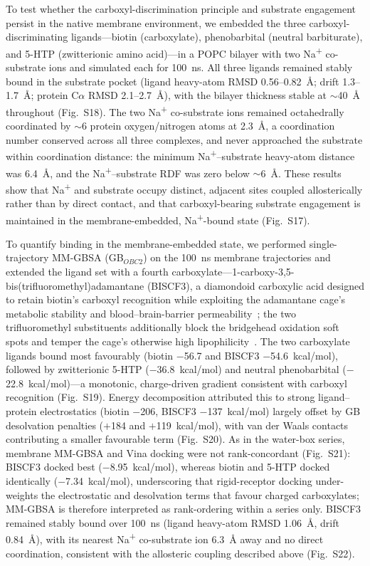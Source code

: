 \documentclass[pdflatex,sn-nature]{sn-jnl}
\begin{document}
To test whether the carboxyl-discrimination principle and substrate engagement persist in the native membrane environment, we embedded the three carboxyl-discriminating ligands---biotin (carboxylate), phenobarbital (neutral barbiturate), and 5-HTP (zwitterionic amino acid)---in a POPC bilayer with two Na\textsuperscript{+} co-substrate ions and simulated each for 100~ns. All three ligands remained stably bound in the substrate pocket (ligand heavy-atom RMSD 0.56--0.82~\AA{}; drift 1.3--1.7~\AA{}; protein C$\alpha$ RMSD 2.1--2.7~\AA{}), with the bilayer thickness stable at $\sim$40~\AA{} throughout (Fig.~S18). The two Na\textsuperscript{+} co-substrate ions remained octahedrally coordinated by $\sim$6 protein oxygen/nitrogen atoms at 2.3~\AA{}, a coordination number conserved across all three complexes, and never approached the substrate within coordination distance: the minimum Na\textsuperscript{+}--substrate heavy-atom distance was 6.4~\AA{}, and the Na\textsuperscript{+}--substrate RDF was zero below $\sim$6~\AA{}. These results show that Na\textsuperscript{+} and substrate occupy distinct, adjacent sites coupled allosterically rather than by direct contact, and that carboxyl-bearing substrate engagement is maintained in the membrane-embedded, Na\textsuperscript{+}-bound state (Fig.~S17).

To quantify binding in the membrane-embedded state, we performed single-trajectory MM-GBSA (GB$_{OBC2}$) on the 100~ns membrane trajectories and extended the ligand set with a fourth carboxylate---1-carboxy-3,5-bis(trifluoromethyl)adamantane (BISCF3), a diamondoid carboxylic acid designed to retain biotin's carboxyl recognition while exploiting the adamantane cage's metabolic stability and blood--brain-barrier permeability~\cite{wanka2013}; the two trifluoromethyl substituents additionally block the bridgehead oxidation soft spots and temper the cage's otherwise high lipophilicity~\cite{dane2025}. The two carboxylate ligands bound most favourably (biotin $-$56.7 and BISCF3 $-$54.6~kcal/mol), followed by zwitterionic 5-HTP ($-$36.8~kcal/mol) and neutral phenobarbital ($-$22.8~kcal/mol)---a monotonic, charge-driven gradient consistent with carboxyl recognition (Fig.~S19). Energy decomposition attributed this to strong ligand--protein electrostatics (biotin $-$206, BISCF3 $-$137~kcal/mol) largely offset by GB desolvation penalties ($+$184 and $+$119~kcal/mol), with van der Waals contacts contributing a smaller favourable term (Fig.~S20). As in the water-box series, membrane MM-GBSA and Vina docking were not rank-concordant (Fig.~S21): BISCF3 docked best ($-$8.95~kcal/mol), whereas biotin and 5-HTP docked identically ($-$7.34~kcal/mol), underscoring that rigid-receptor docking under-weights the electrostatic and desolvation terms that favour charged carboxylates; MM-GBSA is therefore interpreted as rank-ordering within a series only. BISCF3 remained stably bound over 100~ns (ligand heavy-atom RMSD 1.06~\AA{}, drift 0.84~\AA{}), with its nearest Na\textsuperscript{+} co-substrate ion 6.3~\AA{} away and no direct coordination, consistent with the allosteric coupling described above (Fig.~S22).
\end{document}
